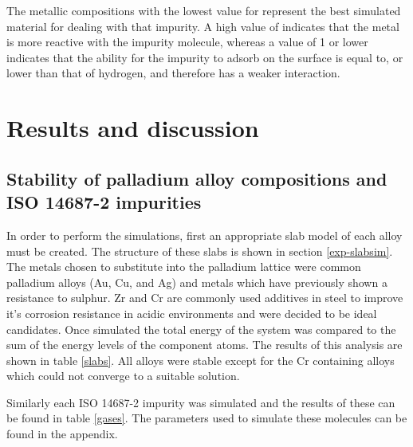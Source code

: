 The metallic compositions with the lowest value for \textsigma \phantom{i} represent the best simulated material for dealing with that impurity. A high value of \textsigma \phantom{i}  indicates that the metal is more reactive with the impurity molecule, whereas a \textsigma \phantom{i} value of 1 or lower indicates that the ability for the impurity to adsorb on the surface is equal to, or lower than that of hydrogen, and therefore has a weaker interaction. 

\section{Results and discussion}
\subsection{Stability of palladium alloy compositions and ISO 14687-2 impurities}
In order to perform the simulations, first an appropriate slab model of each alloy must be created. The structure of these slabs is shown in section \ref{exp-slabsim}. The metals chosen to substitute into the palladium lattice were common palladium alloys (Au, Cu, and Ag) and metals which have previously shown a resistance to sulphur. Zr\cite{SHIN2018102} and Cr\cite{MARCUS1990377} are commonly used additives in steel to improve it's corrosion resistance in acidic environments and were decided to be ideal candidates. Once simulated the total energy of the system was compared to the sum of the energy levels of the component atoms. The results of this analysis are shown in table \ref{slabs}. All alloys were stable except for the Cr containing alloys which could not converge to a suitable solution. 

Similarly each ISO 14687-2 impurity was simulated and the results of these can be found in table \ref{gases}. The parameters used to simulate these molecules can be found in the appendix.

